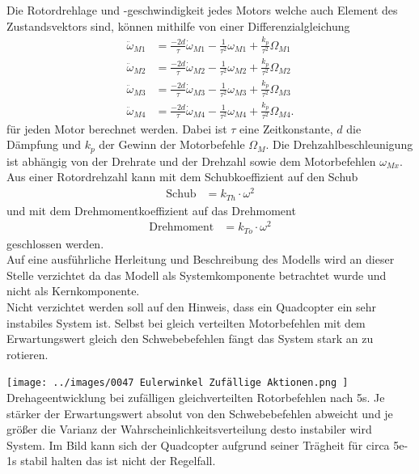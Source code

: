 Die Rotordrehlage und -geschwindigkeit jedes Motors welche auch Element des Zustandsvektors sind, können mithilfe von einer Differenzialgleichung
\begin{align}
	\ddot{\omega}_{M1} &= \frac{-2d}{\tau}\dot{\omega}_{M1} - \frac{1}{\tau^2}\omega_{M1} + \frac{k_p}{\tau^2}\Omega_{M1}\\
	\ddot{\omega}_{M2} &= \frac{-2d}{\tau}\dot{\omega}_{M2} - \frac{1}{\tau^2}\omega_{M2} + \frac{k_p}{\tau^2}\Omega_{M2}\\
	\ddot{\omega}_{M3} &= \frac{-2d}{\tau}\dot{\omega}_{M3} - \frac{1}{\tau^2}\omega_{M3} + \frac{k_p}{\tau^2}\Omega_{M3}\\
	\ddot{\omega}_{M4} &= \frac{-2d}{\tau}\dot{\omega}_{M4} - \frac{1}{\tau^2}\omega_{M4} + \frac{k_p}{\tau^2}\Omega_{M4}.
\end{align}
für jeden Motor berechnet werden.
Dabei ist $\tau$ eine Zeitkonstante, $d$ die Dämpfung und $k_p$ der Gewinn der Motorbefehle $\Omega_{M}$.
Die Drehzahlbeschleunigung ist abhängig von der Drehrate und der Drehzahl sowie dem Motorbefehlen $\omega_{Mx}$. Aus einer Rotordrehzahl kann mit dem Schubkoeffizient auf den Schub
\begin{align}
	\text{Schub} &= k_{Th}\cdot \omega^2
\end{align} und mit dem Drehmomentkoeffizient auf das Drehmoment
\begin{align}
	\text{Drehmoment} &= k_{To}\cdot \omega^2
\end{align}
geschlossen werden.\\
Auf eine ausführliche Herleitung und Beschreibung des Modells wird an dieser Stelle verzichtet da das Modell als Systemkomponente betrachtet wurde und nicht als Kernkomponente.\\
Nicht verzichtet werden soll auf den Hinweis, dass ein Quadcopter ein sehr instabiles System ist. Selbst bei gleich verteilten Motorbefehlen mit dem Erwartungswert gleich den Schwebebefehlen fängt das System stark an zu rotieren.
\begin{center}
	\texttt{[image: ../images/0047 Eulerwinkel Zufällige Aktionen.png
	]}{\\Drehageentwicklung bei zufälligen gleichverteilten Rotorbefehlen nach 5s. Je stärker der Erwartungswert absolut von den Schwebebefehlen abweicht und je größer die Varianz der Wahrscheinlichkeitsverteilung desto instabiler wird System. Im Bild kann sich der Quadcopter aufgrund seiner Trägheit für circa 5e-1s stabil halten das ist nicht der Regelfall.}
\end{center}



